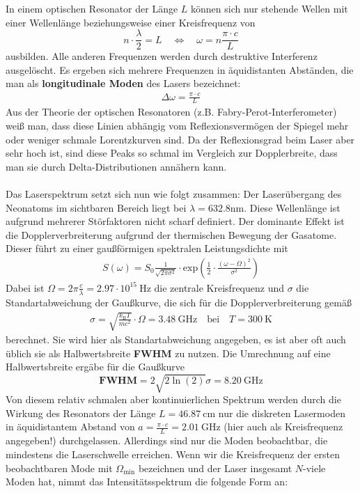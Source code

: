 \documentclass[german,  %
parskip=full,  %
]{scrartcl}
\begin{document}
In einem optischen Resonator der Länge \(L\) können sich nur stehende Wellen mit einer Wellenlänge beziehungsweise einer Kreisfrequenz von
\[n\cdot\frac{\lambda}{2} = L  \quad\Longleftrightarrow\quad \omega = n\frac{\pi\cdot c}{L}\]
ausbilden. Alle anderen Frequenzen werden durch destruktive Interferenz ausgelöscht. Es ergeben sich mehrere Frequenzen in äquidistanten Abständen, die man als \textbf{longitudinale Moden} des Lasers bezeichnet:
\begin{align}
\Delta\omega = \frac{\pi\cdot c}{L}
\end{align}
Aus der Theorie der optischen Resonatoren (z.B. Fabry-Perot-Interferometer) weiß man, dass diese Linien abhängig vom Reflexionsvermögen der Spiegel mehr oder weniger schmale Lorentzkurven sind. Da der Reflexionsgrad beim Laser aber sehr hoch ist, sind diese Peaks so schmal im Vergleich zur Dopplerbreite, dass man sie durch Delta-Distributionen annähern kann. \\\\
Das Laserspektrum setzt sich nun wie folgt zusammen: Der Laserübergang des Neonatoms im sichtbaren Bereich liegt bei \(\lambda = 632.8 \mathrm{nm}\). Diese Wellenlänge ist aufgrund mehrerer Störfaktoren nicht scharf definiert. Der dominante Effekt ist die Dopplerverbreiterung aufgrund der thermischen Bewegung der Gasatome. Dieser führt zu einer gaußförmigen spektralen Leistungsdichte mit
\begin{align}
S(\omega) = S_0 \frac{1}{\sqrt{2\pi\sigma^2}}\cdot\mathrm{exp}\left(\frac{1}{2}\cdot\frac{(\omega-\Omega)^2}{\sigma^2}\right)
\end{align}
Dabei ist \(\Omega = 2\pi \frac{c}{\lambda} = 2.97\cdot 10^{15} \ \mathrm{Hz} \) die zentrale Kreisfrequenz und \(\sigma\) die Standartabweichung der Gaußkurve, die sich für die Dopplerverbreiterung gemäß
\begin{align*}
\sigma = \sqrt{\frac{k_{\mathrm{B}}T}{mc^2}} \cdot \Omega = 3.48 \ \mathrm{GHz} \quad\text{bei}\quad T=300 \ \mathrm{K}
\end{align*}
berechnet. Sie wird hier als Standartabweichung angegeben, es ist aber oft auch üblich sie als Halbwertsbreite \textbf{FWHM} zu nutzen. Die Umrechnung auf eine Halbwertsbreite ergäbe für die Gaußkurve
\[\textbf{FWHM} = 2\sqrt{2\ln(2)}\sigma = 8.20 \ \mathrm{GHz}\]
Von diesem relativ schmalen aber kontinuierlichen Spektrum werden durch die Wirkung des Resonators der Länge \(L=46.87 \ \mathrm{cm}\) nur die diskreten Lasermoden in äquidistantem Abstand von \(a = \frac{\pi\cdot c}{L} = 2.01 \ \mathrm{GHz}\) (hier auch als Kreisfrequenz angegeben!) durchgelassen. Allerdings sind nur die Moden beobachtbar, die mindestens die Laserschwelle erreichen. Wenn wir die Kreisfrequenz der ersten beobachtbaren Mode mit \(\Omega_{\mathrm{min}}\) bezeichnen und der Laser insgesamt \(N\)-viele Moden hat, nimmt das Intensitätsspektrum die folgende Form an: 
\end{document}
